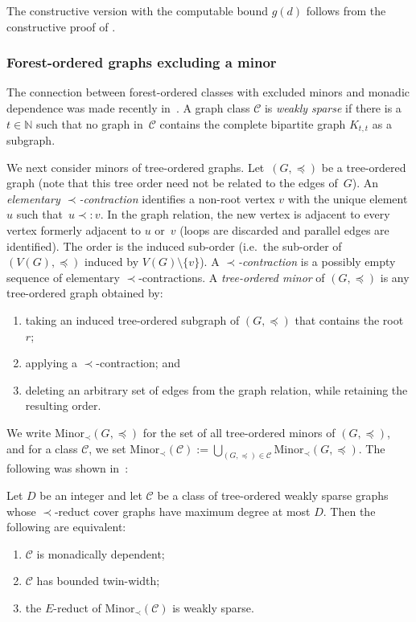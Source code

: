 \documentclass[1p,number,11pt]{elsarticle}
\theoremstyle{plain}
\newcommand{\Cc}{\mathscr{C}}
\newcommand{\pred}{\mathbin{\prec:}}
\newcommand{\Minor}{\mathrm{Minor}}
\begin{document}
The constructive version with the computable bound $g(d)$ follows from the constructive proof of \cite[Theorem~8.1]{bonnet2022twwI}. 

\subsubsection{Forest-ordered graphs excluding a minor}

The connection between forest-ordered classes with excluded minors and monadic dependence was made recently in~\cite{buffiere2026characterizations}.
A graph class $\Cc$ is \emph{weakly sparse} if there is a $t\in\mathbb{N}$ such that no graph in~$\Cc$ contains the complete bipartite graph $K_{t,t}$ as a subgraph.



\pagebreak
We next consider minors of tree-ordered graphs.
Let~$(G,\preceq)$ be a tree-ordered graph (note that this tree order need not be related to the edges of~$G$).
An \emph{elementary $\prec$-contraction} identifies a non-root vertex $v$ with the unique element $u$ such that~$u \pred v$.
In the graph relation, the new vertex is adjacent to every vertex formerly adjacent to $u$ or~$v$ (loops are discarded and parallel edges are identified).
The order is the induced sub-order (i.e.\ the sub-order of $(V(G),\preceq)$ induced by $V(G)\setminus\{v\}$).
A \emph{$\prec$-contraction} is a possibly empty sequence of elementary $\prec$-contractions.
A \emph{tree-ordered minor} of $(G,\preceq)$ is any tree-ordered graph obtained by:
\begin{enumerate}[label=(\roman*),nosep]
  \item taking an induced tree-ordered subgraph of $(G,\preceq)$ that contains the root $r$;
  \item applying a $\prec$-contraction; and
  \item deleting an arbitrary set of edges from the graph relation, while retaining the resulting order.
\end{enumerate}
We write $\Minor_{\prec}(G,\preceq)$ for the set of all tree-ordered minors of $(G,\preceq)$, and for a class $\Cc$, we set $\Minor_{\prec}(\Cc) := \bigcup_{(G,\preceq)\in\Cc}\Minor_{\prec}(G,\preceq)$.
The following was shown in~\cite{buffiere2026characterizations}:

\begin{theorem}\label{thm:bounded-degree-covergraph}
Let $D$ be an integer and let $\Cc$ be a class of tree-ordered weakly sparse graphs
whose $\prec$-reduct cover graphs have maximum degree at most $D$.
Then the following are equivalent:
\begin{enumerate}[label=(\arabic*),nosep]
  \item $\Cc$ is monadically dependent;
  \item $\Cc$ has bounded twin-width;
  \item the $E$-reduct of $\Minor_{\prec}(\Cc)$ is weakly sparse.
\end{enumerate}
\end{theorem}
\end{document}
